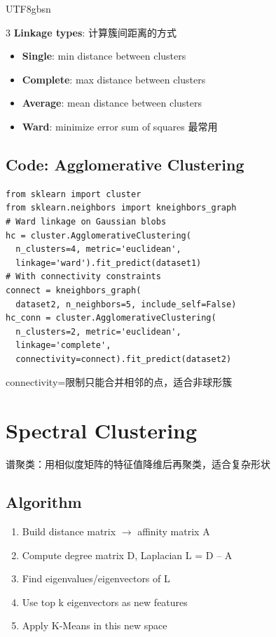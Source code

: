 \documentclass[9pt,landscape,a4paper]{article}
\newcommand{\zhint}[1]{{\scriptsize\color{gray!70!black}#1}}
\begin{document}
\begin{CJK}{UTF8}{gbsn}
\begin{multicols}{3}
\textbf{Linkage types}: \zhint{计算簇间距离的方式}
\begin{itemize}[leftmargin=8pt,itemsep=0pt,topsep=0pt]
\item \textbf{Single}: min distance between clusters
\item \textbf{Complete}: max distance between clusters
\item \textbf{Average}: mean distance between clusters
\item \textbf{Ward}: minimize error sum of squares \zhint{最常用}
\end{itemize}

\subsection{Code: Agglomerative Clustering}
\begin{lstlisting}
from sklearn import cluster
from sklearn.neighbors import kneighbors_graph
# Ward linkage on Gaussian blobs
hc = cluster.AgglomerativeClustering(
  n_clusters=4, metric='euclidean',
  linkage='ward').fit_predict(dataset1)
# With connectivity constraints
connect = kneighbors_graph(
  dataset2, n_neighbors=5, include_self=False)
hc_conn = cluster.AgglomerativeClustering(
  n_clusters=2, metric='euclidean',
  linkage='complete',
  connectivity=connect).fit_predict(dataset2)
\end{lstlisting}
\zhint{connectivity=限制只能合并相邻的点，适合非球形簇}

\section{Spectral Clustering}
\zhint{谱聚类：用相似度矩阵的特征值降维后再聚类，适合复杂形状}

\subsection{Algorithm}
\begin{enumerate}[leftmargin=10pt,itemsep=0pt,topsep=0pt]
\item Build distance matrix $\to$ affinity matrix A
\item Compute degree matrix D, Laplacian L = D -- A
\item Find eigenvalues/eigenvectors of L
\item Use top k eigenvectors as new features
\item Apply K-Means in this new space
\end{enumerate}


\end{multicols}
\end{CJK}
\end{document}
